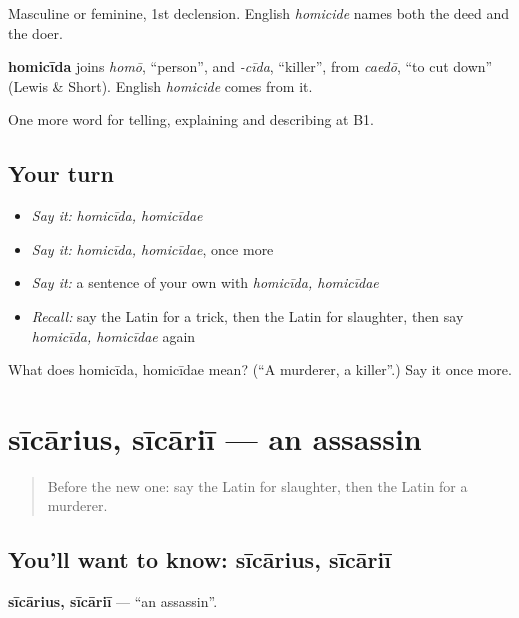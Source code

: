 Masculine or feminine, 1st declension. English \emph{homicide} names both the deed and the doer.

\begin{cousinweb}
\textbf{homicīda} joins \emph{homō}, \textquotedblleft{}person\textquotedblright{}, and \emph{-cīda}, \textquotedblleft{}killer\textquotedblright{}, from \emph{caedō}, \textquotedblleft{}to cut down\textquotedblright{} (Lewis \& Short). English \emph{homicide} comes from it.
\end{cousinweb}

\begin{grammarlens}[title={What you've built}]
One more word for telling, explaining and describing at B1.
\end{grammarlens}

\subsection*{Your turn}
\begin{itemize}
\raggedright
  \item \emph{Say it:} \emph{homicīda, homicīdae}
  \item \emph{Say it:} \emph{homicīda, homicīdae}, once more
  \item \emph{Say it:} a sentence of your own with \emph{homicīda, homicīdae}
  \item \emph{Recall:} say the Latin for a trick, then the Latin for slaughter, then say \emph{homicīda, homicīdae} again
\end{itemize}

\begin{tcolorbox}[breakable,colback=teal!4,colframe=teal!35!black,title={Before you move on}]
What does homicīda, homicīdae mean? (\textquotedblleft{}A murderer, a killer\textquotedblright{}.) Say it once more.
\end{tcolorbox}
\section[sīcārius, sīcāriī]{sīcārius, sīcāriī — an assassin}

\label{lesson:LA-C306-sicarius}



\begin{quote}
Before the new one: say the Latin for slaughter, then the Latin for a murderer.
\end{quote}

\subsection*{You'll want to know: sīcārius, sīcāriī}
\textbf{sīcārius, sīcāriī} — \textquotedblleft{}an assassin\textquotedblright{}.

